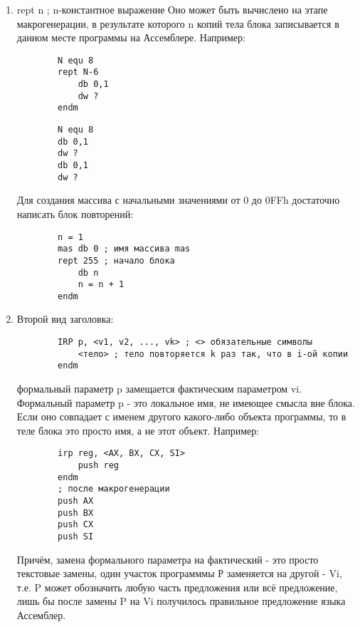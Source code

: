 \begin{enumerate}
    \item rept n ; n-константное выражение
    Оно может быть вычислено на этапе макрогенерации, в результате которого n копий тела блока записывается в данном месте программы на Ассемблере. Например:
    \begin{verbatim}
        N equ 8
        rept N-6
            db 0,1
            dw ?
        endm
    \end{verbatim}

    \begin{verbatim}
        N equ 8
        db 0,1
        dw ?
        db 0,1
        dw ?
    \end{verbatim}
    
    Для создания массива с начальными значениями от 0 до 0FFh достаточно написать блок повторений:
    \begin{verbatim}
        n = 1
        mas db 0 ; имя массива mas
        rept 255 ; начало блока
            db n
            n = n + 1
        endm
    \end{verbatim}
    \item Второй вид заголовка:
    \begin{verbatim}
        IRP p, <v1, v2, ..., vk> ; <> обязательные символы
            <тело> ; тело повторяется k раз так, что в i-ой копии
        endm
    \end{verbatim}
    формальный параметр p замещается фактическим параметром vi. Формальный параметр p - это локальное имя, не имеющее смысла вне блока. Если оно совпадает с именем другого какого-либо объекта программы, то в теле блока это просто имя, а не этот объект. Например:
    \begin{verbatim}
        irp reg, <AX, BX, CX, SI>
            push reg
        endm
        ; после макрогенерации
        push AX
        push BX
        push CX
        push SI
    \end{verbatim}
    Причём, замена формального параметра на фактический - это просто текстовые замены, один участок программмы Р заменяется на другой - Vi, т.е. P может обозначить любую часть предложения или всё предложение, лишь бы после замены P на Vi получилось правильное предложение языка Ассемблер.


\end{enumerate}
